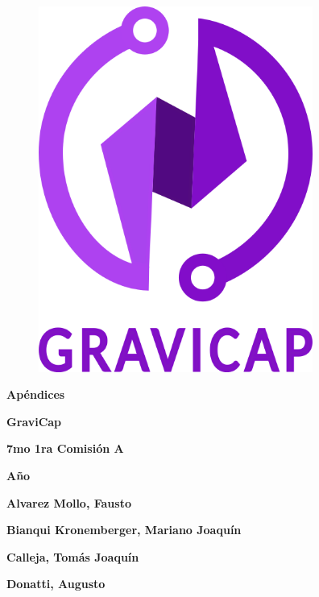 \documentclass[28pt, a4paper]{report}
\begin{document}
\begin{titlepage}

        \begin{center}      
            \begin{figure} [!ht]
                \centering
                \includegraphics [width=9cm]{Imagenes/Preface/Logo-Nombre.png}
                \label{Logo-Nombre}
            \end{figure}
            {\Huge\textbf{Apéndices}}\par
                \vspace{0.2cm}
            {\LARGE\textbf{{\textcolor{dark_violet}{\textbf{GraviCap}}}}}\par
                \vspace{1.5cm}
            {\LARGE\textbf{7mo 1ra Comisión A}}\par
                \vspace{0.2cm}
            {\LARGE\textbf{Año \the\year}}\par
                \vspace{1cm}
            {\Large\textbf{{Alvarez Mollo, Fausto}}}\par
            {\Large\textbf{{Bianqui Kronemberger, Mariano Joaquín}}}\par
            {\Large\textbf{{Calleja, Tomás Joaquín}}}\par
            {\Large\textbf{{Donatti, Augusto}}}\par

\end{center}
\end{titlepage}
\end{document}
